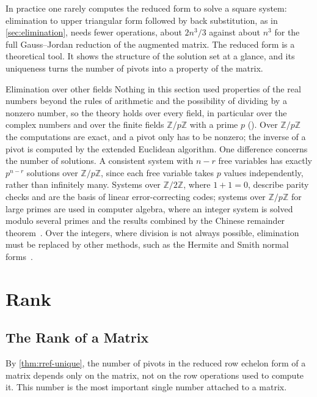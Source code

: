 In practice one rarely computes the reduced form to solve a square system: elimination to upper triangular form followed by back substitution, as in \cref{sec:elimination}, needs fewer operations, about $2n^3/3$ against about $n^3$ for the full Gauss--Jordan reduction of the augmented matrix. The reduced form is a theoretical tool. It shows the structure of the solution set at a glance, and its uniqueness turns the number of pivots into a property of the matrix.

\begin{note}{Elimination over other fields}
Nothing in this section used properties of the real numbers beyond the rules of arithmetic and the possibility of dividing by a nonzero number, so the theory holds over every field, in particular over the complex numbers and over the finite fields $\mathbb Z/p\mathbb Z$ with a prime $p$ (). Over $\mathbb Z/p\mathbb Z$ the computations are exact, and a pivot only has to be nonzero; the inverse of a pivot is computed by the extended Euclidean algorithm. One difference concerns the number of solutions. A consistent system with $n-r$ free variables has exactly $p^{n-r}$ solutions over $\mathbb Z/p\mathbb Z$, since each free variable takes $p$ values independently, rather than infinitely many. Systems over $\mathbb Z/2\mathbb Z$, where $1+1=0$, describe parity checks and are the basis of linear error-correcting codes; systems over $\mathbb Z/p\mathbb Z$ for large primes are used in computer algebra, where an integer system is solved modulo several primes and the results combined by the Chinese remainder theorem~\cite[Sect.~4.3.2]{knuth1997taocp2}. Over the integers, where division is not always possible, elimination must be replaced by other methods, such as the Hermite and Smith normal forms~\cite{cohen1993}.
\end{note}
\section{Rank}
\label{sec:rank}

\subsection{The Rank of a Matrix}

By \cref{thm:rref-unique}, the number of pivots in the reduced row echelon form of a matrix depends only on the matrix, not on the row operations used to compute it. This number is the most important single number attached to a matrix.

